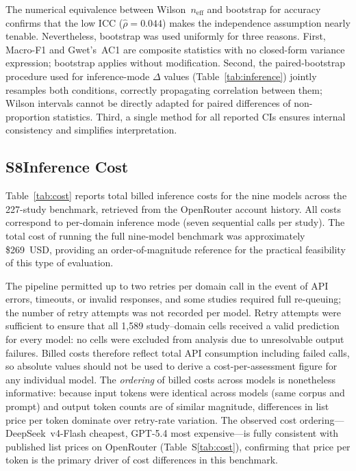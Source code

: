 \documentclass[../main.tex]{subfiles}
\begin{document}
The numerical equivalence between Wilson~$n_{\text{eff}}$ and bootstrap for
accuracy confirms that the low ICC ($\hat\rho = 0.044$) makes the independence
assumption nearly tenable.
Nevertheless, bootstrap was used uniformly for three reasons.
First, Macro-F1 and Gwet's~AC1 are composite statistics with no closed-form
variance expression; bootstrap applies without modification.
Second, the paired-bootstrap procedure used for inference-mode $\Delta$ values
(Table~\ref{tab:inference}) jointly resamples both conditions, correctly
propagating correlation between them; Wilson intervals cannot be directly
adapted for paired differences of non-proportion statistics.
Third, a single method for all reported CIs ensures internal consistency and
simplifies interpretation.


\clearpage
\subsection*{S8\quad Inference Cost}
\label{sec:si-cost}

Table~\ref{tab:cost} reports total billed inference costs for the nine models
across the 227-study benchmark, retrieved from the OpenRouter account history.
All costs correspond to per-domain inference mode (seven sequential calls per study).
The total cost of running the full nine-model benchmark was approximately
\$269~USD, providing an order-of-magnitude reference for the practical
feasibility of this type of evaluation.

The pipeline permitted up to two retries per domain call in the event of API
errors, timeouts, or invalid responses, and some studies required full
re-queuing; the number of retry attempts was not recorded per model.
Retry attempts were sufficient to ensure that all 1{,}589 study--domain cells
received a valid prediction for every model: no cells were excluded from
analysis due to unresolvable output failures.
Billed costs therefore reflect total API consumption including failed calls,
so absolute values should not be used to derive a cost-per-assessment figure
for any individual model.
The \emph{ordering} of billed costs across models is nonetheless informative:
because input tokens were identical across models (same corpus and prompt) and
output token counts are of similar magnitude, differences in list price per
token dominate over retry-rate variation.
The observed cost ordering---DeepSeek~v4-Flash cheapest, GPT-5.4 most
expensive---is fully consistent with published list prices on OpenRouter
(Table~S\ref{tab:cost}), confirming that price per token is the primary driver
of cost differences in this benchmark.
\end{document}
